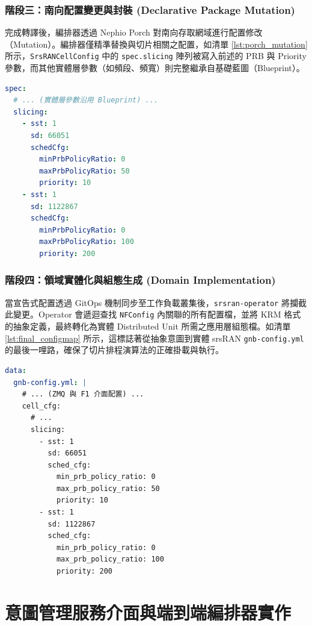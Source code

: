 \subsubsection{階段三：南向配置變更與封裝 (Declarative Package Mutation)}
完成轉譯後，編排器透過 Nephio Porch 對南向存取網域進行配置修改（Mutation）。編排器僅精準替換與切片相關之配置，如清單 \ref{lst:porch_mutation} 所示，\texttt{SrsRANCellConfig} 中的 \texttt{spec.slicing} 陣列被寫入前述的 PRB 與 Priority 參數，而其他實體層參數（如頻段、頻寬）則完整繼承自基礎藍圖（Blueprint）。

\begin{lstlisting}[language=yaml, caption={Porch 修改後之 SrsRANCellConfig 宣告 (片段)}, label={lst:porch_mutation}]
spec:
  # ... (實體層參數沿用 Blueprint) ...
  slicing:
    - sst: 1
      sd: 66051
      schedCfg:
        minPrbPolicyRatio: 0
        maxPrbPolicyRatio: 50
        priority: 10
    - sst: 1
      sd: 1122867
      schedCfg:
        minPrbPolicyRatio: 0
        maxPrbPolicyRatio: 100
        priority: 200
\end{lstlisting}

\subsubsection{階段四：領域實體化與組態生成 (Domain Implementation)}
當宣告式配置透過 GitOps 機制同步至工作負載叢集後，\texttt{srsran-operator} 將攔截此變更。Operator 會遞迴查找 \texttt{NFConfig} 內關聯的所有配置檔，並將 KRM 格式的抽象定義，最終轉化為實體 Distributed Unit 所需之應用層組態檔。如清單 \ref{lst:final_configmap} 所示，這標誌著從抽象意圖到實體 srsRAN \texttt{gnb-config.yml} 的最後一哩路，確保了切片排程演算法的正確掛載與執行。

\begin{lstlisting}[language=yaml, caption={srsRAN Operator 生成之最終 DU ConfigMap (片段)}, label={lst:final_configmap}]
data:
  gnb-config.yml: |
    # ... (ZMQ 與 F1 介面配置) ...
    cell_cfg:
      # ...
      slicing:
        - sst: 1
          sd: 66051
          sched_cfg:
            min_prb_policy_ratio: 0
            max_prb_policy_ratio: 50
            priority: 10
        - sst: 1
          sd: 1122867
          sched_cfg:
            min_prb_policy_ratio: 0
            max_prb_policy_ratio: 100
            priority: 200
\end{lstlisting}

\section{意圖管理服務介面與端到端編排器實作}
\label{sec:e2e_orchestrator}

